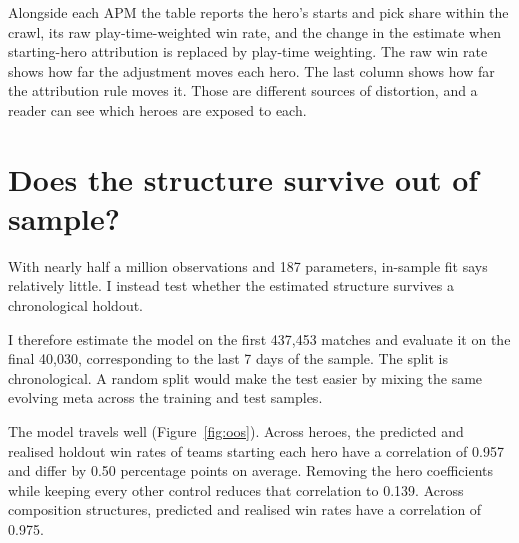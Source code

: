 \documentclass[11pt]{article}
\begin{document}
Alongside each APM the table reports the hero's starts and pick share within the crawl, its raw
play-time-weighted win rate, and the change in the estimate when starting-hero attribution is
replaced by play-time weighting. The raw win rate shows how far the adjustment moves each hero.
The last column shows how far the attribution rule moves it. Those are different sources of
distortion, and a reader can see which heroes are exposed to each.

\FloatBarrier
\section*{Does the structure survive out of sample?}

With nearly half a million observations and 187 parameters, in-sample fit says relatively
little. I instead test whether the estimated structure survives a chronological holdout.

I therefore estimate the model on the first 437,453 matches and evaluate it on the final
40,030, corresponding to the last 7 days of the sample. The split is
chronological. A random split would make the test easier by mixing the same evolving meta across
the training and test samples.

The model travels well (Figure~\ref{fig:oos}). Across heroes, the predicted and realised holdout
win rates of teams starting each hero have a correlation of 0.957 and differ by 0.50
percentage points on average. Removing the hero coefficients while keeping every other control
reduces that correlation to 0.139. Across composition structures, predicted and realised
win rates have a correlation of 0.975.
\end{document}
